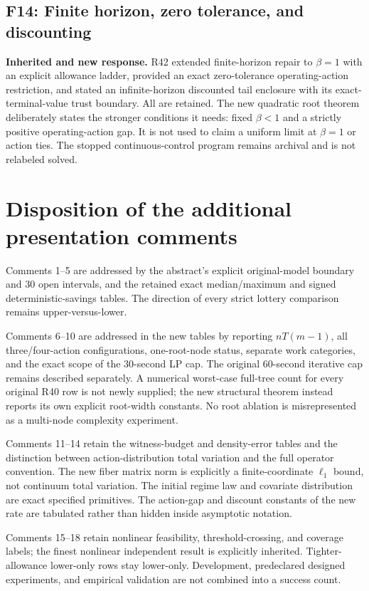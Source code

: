 \subsection*{F14: Finite horizon, zero tolerance, and discounting}
\textbf{Inherited and new response.} R42 extended finite-horizon repair to $\beta=1$ with an explicit allowance ladder, provided an exact zero-tolerance operating-action restriction, and stated an infinite-horizon discounted tail enclosure with its exact-terminal-value trust boundary. All are retained. The new quadratic root theorem deliberately states the stronger conditions it needs: fixed $\beta<1$ and a strictly positive operating-action gap. It is not used to claim a uniform limit at $\beta=1$ or action ties. The stopped continuous-control program remains archival and is not relabeled solved.

\section{Disposition of the additional presentation comments}
Comments 1--5 are addressed by the abstract's explicit original-model boundary and 30 open intervals, and the retained exact median/maximum and signed deterministic-savings tables. The direction of every strict lottery comparison remains upper-versus-lower.

Comments 6--10 are addressed in the new tables by reporting $nT(m-1)$, all three/four-action configurations, one-root-node status, separate work categories, and the exact scope of the 30-second LP cap. The original 60-second iterative cap remains described separately. A numerical worst-case full-tree count for every original R40 row is not newly supplied; the new structural theorem instead reports its own explicit root-width constants. No root ablation is misrepresented as a multi-node complexity experiment.

Comments 11--14 retain the witness-budget and density-error tables and the distinction between action-distribution total variation and the full operator convention. The new fiber matrix norm is explicitly a finite-coordinate $\ell_1$ bound, not continuum total variation. The initial regime law and covariate distribution are exact specified primitives. The action-gap and discount constants of the new rate are tabulated rather than hidden inside asymptotic notation.

Comments 15--18 retain nonlinear feasibility, threshold-crossing, and coverage labels; the finest nonlinear independent result is explicitly inherited. Tighter-allowance lower-only rows stay lower-only. Development, predeclared designed experiments, and empirical validation are not combined into a success count.

